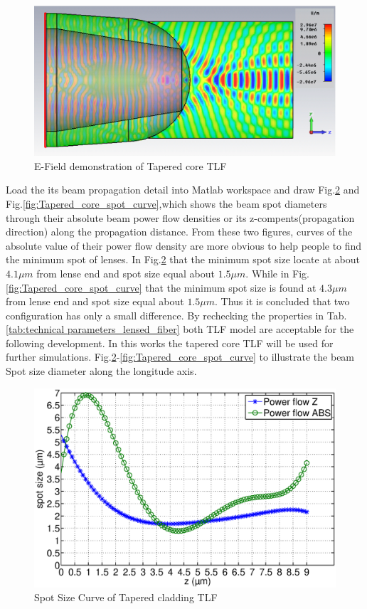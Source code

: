 \begin{figure}[!ht]
	\centering
		\includegraphics[width=0.8 \textwidth]{bilder/cst_lensed_fiber_efield}
		\caption{E-Field demonstration of Tapered core TLF}
 		\label{fig:Tapered_core_efield}	
\end{figure}
Load the its beam propagation detail into Matlab workspace and draw
Fig.\ref{fig:Tapered_cladding_spot_curve} and Fig.\ref{fig:Tapered_core_spot_curve},which shows the beam spot diameters through their absolute beam power flow densities or its z-compents(propagation direction) along the propagation distance. From these two figures, curves of the absolute value of their power flow density are more obvious to help people to find the minimum spot of lenses. In Fig.\ref{fig:Tapered_cladding_spot_curve} that the minimum spot size locate at about $4.1 \mu m$ from lense end and spot size equal about $1.5 \mu m$. While in Fig.\ref{fig:Tapered_core_spot_curve} that the minimum spot size is found at  $4.3 \mu m$ from lense end and spot size equal about $1.5 \mu m$. Thus it is concluded that two configuration has only a small difference. By rechecking the properties in Tab.\ref{tab:technical parameters_lensed_fiber} both TLF model are acceptable for the following development. In this works the tapered core TLF will be used for further simulations.
Fig.\ref{fig:Tapered_cladding_spot_curve}-\ref{fig:Tapered_core_spot_curve} to illustrate the beam Spot size diameter along the longitude axis.
\begin{figure}[!ht]
		\centering
		\includegraphics[width=0.7 \textwidth]{bilder/Tapered_cladding_spot_curve}
		\caption{Spot Size Curve of Tapered cladding TLF}
		\label{fig:Tapered_cladding_spot_curve}
\end{figure} 
